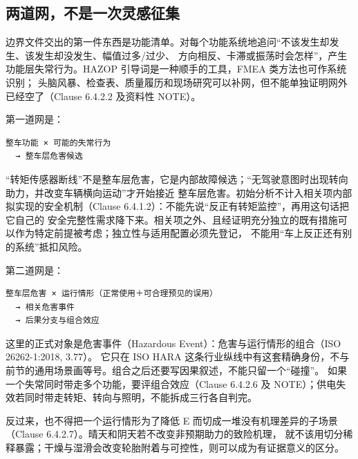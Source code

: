 \subsection{两道网，不是一次灵感征集}

边界文件交出的第一件东西是功能清单。对每个功能系统地追问“不该发生却发生、该发生却没发生、幅值过多/过少、
方向相反、卡滞或振荡时会怎样”，产生功能层失常行为。HAZOP 引导词是一种顺手的工具，FMEA 类方法也可作系统识别；
头脑风暴、检查表、质量履历和现场研究可以补网，但不能单独证明网外已经空了（Clause 6.4.2.2 及资料性 NOTE）。

第一道网是：

\nopagebreak[4]
\begin{codebox}
\begin{Verbatim}[fontsize=\small,breaklines=true,breakanywhere=true,breaksymbolleft={},breaksymbolright={}]
整车功能 × 可能的失常行为
  → 整车层危害候选
\end{Verbatim}
\end{codebox}

“转矩传感器断线”不是整车层危害，它是内部故障候选；“无驾驶意图时出现转向助力，并改变车辆横向运动”才开始接近
整车层危害。初始分析不计入相关项内部拟实现的安全机制（Clause 6.4.1.2）：不能先说“反正有转矩监控”，再用这句话把它自己的
安全完整性需求降下来。相关项之外、且经证明充分独立的既有措施可以作为特定前提被考虑；独立性与适用配置必须先登记，
不能用“车上反正还有别的系统”抵扣风险。

第二道网是：

\nopagebreak[4]
\begin{codebox}
\begin{Verbatim}[fontsize=\small,breaklines=true,breakanywhere=true,breaksymbolleft={},breaksymbolright={}]
整车层危害 × 运行情形（正常使用＋可合理预见的误用）
  → 相关危害事件
  → 后果分支与组合效应
\end{Verbatim}
\end{codebox}

这里的正式对象是危害事件（Hazardous Event）：危害与运行情形的组合（ISO 26262-1:2018, 3.77）。
它只在 ISO HARA 这条行业纵线中有这套精确身份，不与前节的通用场景画等号。组合之后还要写因果叙述，不能只留一个“碰撞”。
如果一个失常同时带走多个功能，要评组合效应（Clause 6.4.2.6 及 NOTE）；供电失效若同时带走转矩、转向与照明，不能拆成三行各自判完。

反过来，也不得把一个运行情形为了降低 E 而切成一堆没有机理差异的子场景（Clause 6.4.2.7）。晴天和阴天若不改变非预期助力的致险机理，
就不该用切分稀释暴露；干燥与湿滑会改变轮胎附着与可控性，则可以成为有证据意义的区分。

